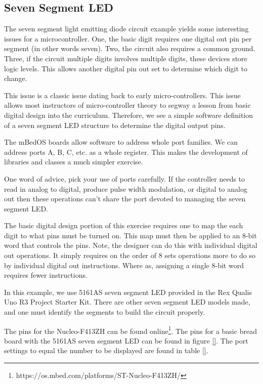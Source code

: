 \documentclass{article}
\begin{document}

\subsection{Seven Segment LED} %
\label{sub:seven_segment_led}

The seven segment light emitting diode circuit example yields some interesting issues for a microcontroller.  One, the basic digit requires one digital out pin per segment (in other words seven).   Two, the circuit also requires a common ground.  Three, if the circuit multiple digits involves multiple digits, these devices store logic levels.  This allows another digital pin out set to determine which digit to change.  

This issue is a classic issue dating back to early micro-controllers.  This issue allows most instructors of micro-controller theory to segway a lesson from basic digital design into the curriculum.  Therefore, we see a simple software definition of a seven segment LED structure to determine the digital output pins.

The mBedOS boards allow software to address whole port families.  We can address ports A, B, C, etc. as a whole register.  This makes the development of libraries and classes a much simpler exercise.  

One word of advice, pick your use of ports carefully.  If the controller needs to read in analog to digital, produce pulse width modulation, or digital to analog out then these operations can't share the port devoted to managing the seven segment LED.

The basic digital design portion of this exercise requires one to map the each digit to what pins must be turned on.  This map must then be applied to an 8-bit word that controls the pins.  Note, the designer can do this with individual digital out operations.  It simply requires on the order of 8 sets operations more to do so by individual digital out instructions.  Where as, assigning a single 8-bit word requires fewer instructions.

In this example, we use 5161AS seven segment LED provided in the Rex Qualis Uno R3 Project Starter Kit.  There are other seven segment LED models made, and one must identify the segments to build the circuit properly. 

The pins for the Nucleo-F413ZH can be found online\footnote{https://os.mbed.com/platforms/ST-Nucleo-F413ZH/}.  The pins for a basic bread board with the 5161AS seven segment LED can be found in figure \ref{}.  The port settings to equal the number to be displayed are found in table \ref{}.
\end{document}
